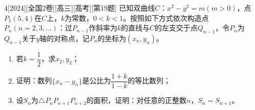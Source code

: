 \begin{example}{4}[2024][全国2卷][高三][高考][第19题]
已知双曲线$C$：$x^2-y^2=m(m>0)$，点$P_1(5,4)$在$C$上，$k$为常数，$0<k<1$。按照如下方式依次构造点$P_n(n=2,3,\dots)$：过$P_{n-1}$作斜率为$k$的直线与$C$的左支交于点$Q_{n-1}$，令$P_n$为$Q_{n-1}$关于$y$轴的对称点，记$P_n$的坐标为$(x_n,y_n)$。
\begin{enumerate}
\item 若$k=\dfrac{1}{2}$，求$x_2,y_2$；
\item 证明：数列$\{x_n-y_n\}$是公比为$\dfrac{1+k}{1-k}$的等比数列；
\item 设$S_n$为$\triangle P_nP_{n+1}P_{n+2}$的面积，证明：对任意的正整数$n$，$S_n=S_{n+1}$。
\end{enumerate}
\end{example}